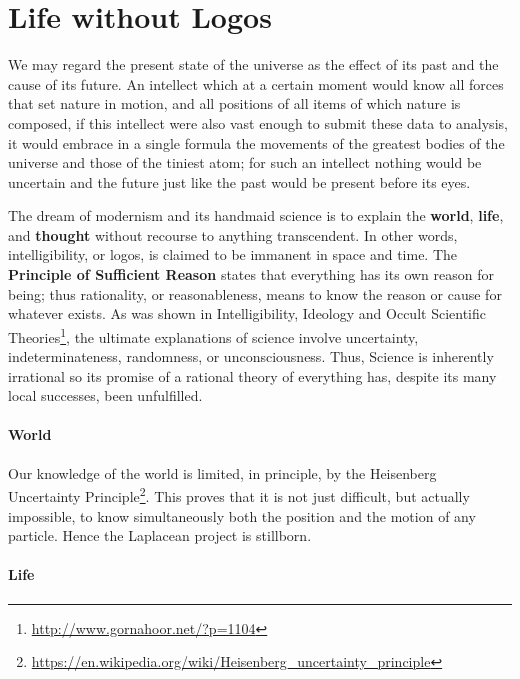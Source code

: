\section{Life without Logos}

\begin{quotex}
We may regard the present state of the universe as the effect of its past and the cause of its future. An intellect which at a certain moment would know all forces that set nature in motion, and all positions of all items of which nature is composed, if this intellect were also vast enough to submit these data to analysis, it would embrace in a single formula the movements of the greatest bodies of the universe and those of the tiniest atom; for such an intellect nothing would be uncertain and the future just like the past would be present before its eyes.
\end{quotex}


The dream of modernism and its handmaid science is to explain the \textbf{world}, \textbf{life}, and \textbf{thought} without recourse to anything transcendent. In other words, intelligibility, or logos, is claimed to be immanent in space and time. The \textbf{Principle of Sufficient Reason} states that everything has its own reason for being; thus rationality, or reasonableness, means to know the reason or cause for whatever exists. As was shown in Intelligibility, Ideology and Occult Scientific Theories\footnote{\url{http://www.gornahoor.net/?p=1104}}, the ultimate explanations of science involve uncertainty, indeterminateness, randomness, or unconsciousness. Thus, Science is inherently irrational so its promise of a rational theory of everything has, despite its many local successes, been unfulfilled.

\paragraph{World}


Our knowledge of the world is limited, in principle, by the Heisenberg Uncertainty Principle\footnote{\url{https://en.wikipedia.org/wiki/Heisenberg\_uncertainty\_principle}}. This proves that it is not just difficult, but actually impossible, to know simultaneously both the position and the motion of any particle. Hence the Laplacean project is stillborn.

\paragraph{Life}


